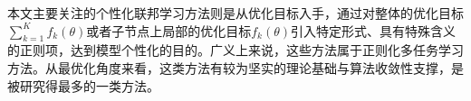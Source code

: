 本文主要关注的个性化联邦学习方法则是从优化目标入手，通过对整体的优化目标$\sum\limits_{k=1}^K f_k(\theta)$或者子节点上局部的优化目标$f_k(\theta)$引入特定形式、具有特殊含义的正则项，达到模型个性化的目的\cite{hanzely2020federated,t2020pfedme,dinh2021fedu,li2021pfedmac,li_2021_ditto,acar2021feddyn}。广义上来说，这些方法属于正则化多任务学习方法\cite{Caruana_1997_mtl, evgeniou2004regularized}。从最优化角度来看，这类方法有较为坚实的理论基础与算法收敛性支撑，是被研究得最多的一类方法。
